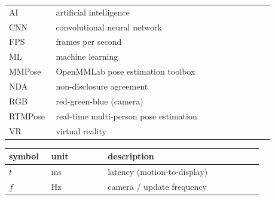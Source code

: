 
\begin{tabular}{p{0.12\linewidth} p{0.76\linewidth}}
AI   & artificial intelligence \\
CNN  & convolutional neural network \\
FPS  & frames per second \\
ML   & machine learning \\
MMPose & OpenMMLab pose estimation toolbox \\
NDA  & non-disclosure agreement \\
RGB  & red-green-blue (camera) \\
RTMPose & real-time multi-person pose estimation \\
VR   & virtual reality \\
\end{tabular}

\begin{center}
\begin{tabular}{p{0.15\linewidth} p{0.2\linewidth} p{0.55\linewidth}}
\hline
symbol & unit & description \\\hline
$t$ & ms & latency (motion-to-display) \\
$f$ & Hz & camera / update frequency \\
\hline
\end{tabular}
\end{center}
